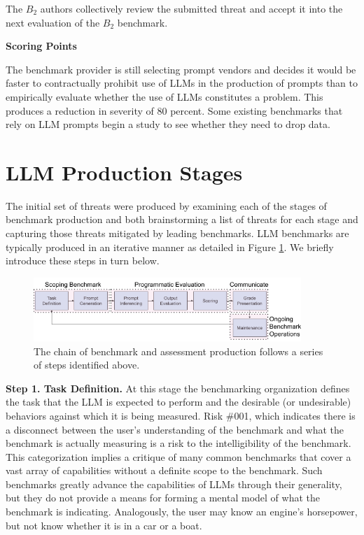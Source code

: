 \documentclass{article}
\newcommand\bb{$B_2$ }
\begin{document}
The \bb authors collectively review the submitted threat and accept it into the next evaluation of the \bb benchmark.

\textbf{Scoring Points}

The benchmark provider is still selecting prompt vendors and decides it would be faster to contractually prohibit use of LLMs in the production of prompts than to empirically evaluate whether the use of LLMs constitutes a problem. This produces a reduction in severity of 80 percent. Some existing benchmarks that rely on LLM prompts begin a study to see whether they need to drop data.
\section{LLM Production Stages}
The initial set of threats were produced by examining each of the stages of benchmark production and both brainstorming a list of threats for each stage and capturing those threats mitigated by leading benchmarks.  LLM benchmarks are typically produced in an iterative manner as detailed in Figure \ref{fig:benchmark-production}. We briefly introduce these steps in turn below.

\begin{figure}[h!]
  \centering
  \includegraphics[width=0.9\textwidth]{image1.png}
  \caption{The chain of benchmark and assessment production follows a series of steps identified above.}
  \label{fig:benchmark-production}
\end{figure}

{\bf Step 1. Task Definition.} At this stage the benchmarking organization defines the task that the LLM is expected to perform and the desirable (or undesirable) behaviors against which it is being measured. Risk \#001, which indicates there is a disconnect between the user's understanding of the benchmark and what the benchmark is actually measuring is a risk to the intelligibility of the benchmark. This categorization implies a critique of many common benchmarks that cover a vast array of capabilities without a definite scope to the benchmark. Such benchmarks greatly advance the capabilities of LLMs through their generality, but they do not provide a means for forming a mental model of what the benchmark is indicating. Analogously, the user may know an engine's horsepower, but not know whether it is in a car or a boat.
\end{document}
